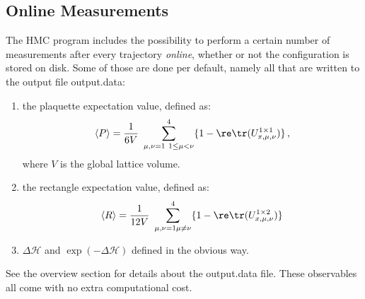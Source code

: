 \subsection{Online Measurements}

The HMC program includes the possibility to perform a certain number
of measurements after every trajectory \emph{online}, whether or not
the configuration is stored on disk. Some of those are done per
default, namely all that are written to the output file {\ttfamily
  output.data}: 
\begin{enumerate}
\item the plaquette expectation value, defined as:
  \[
  \langle P\rangle = \frac{1}{6 V}\ \sum_{\substack{
        \mu,\nu=1\ 1\leq\mu<\nu}}^4\{1-\re\tr(U^{1\times1}_{x,\mu,\nu})\}\, ,
  \]
  where $V$ is the global lattice volume.
\item the rectangle expectation value, defined as:
  \[
  \langle R\rangle = \frac{1}{12V}\ \sum_{\substack{\mu,\nu=1 \mu\neq\nu}}^4\{1
    -\re\tr(U^{1\times2}_{x,\mu,\nu})\}
  \]
\item $\Delta\mathcal{H}$ and $\exp(-\Delta\mathcal{H})$ defined in
  the obvious way.
\end{enumerate}
See the overview section for details about the {\ttfamily output.data}
file. These observables all come with no extra computational cost.

